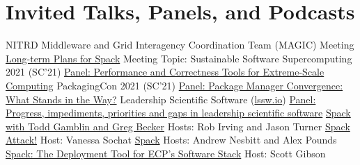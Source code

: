 \section{Invited Talks, Panels, and Podcasts}
                {NITRD Middleware and Grid Interagency Coordination Team (MAGIC) Meeting}
		{\newline \href{https://www.nitrd.gov/nitrdgroups/images/2021/MAGIC-Todd-Gamblin-12012021.pdf}{Long-term Plans for Spack}}
		{Meeting Topic: Sustainable Software}
        {}{}{}
                {Supercomputing 2021 (SC'21)}
		{\newline \href{https://sc21.supercomputing.org/presentation/?id=pan129&sess=sess236}{Panel: Performance and Correctness Tools for Extreme-Scale Computing}}
		{}
        {}{}{}
                {PackagingCon 2021 (SC'21)}
		{\newline \href{https://www.youtube.com/watch?v=NuaDWoOwPA0}{Panel: Package Manager Convergence: What Stands in the Way?}}
		{}
        {}{}{}
                {Leadership Scientific Software (\href{https://lssw.io}{lssw.io})}
		{\newline \href{https://leadershipscientificsoftware.github.io/Meeting2.html}{Panel: Progress, impediments, priorities and gaps in leadership scientific software}}
		{}
        {}{}{}
		{\newline \href{https://cppcast.com/spack/}{Spack with Todd Gamblin and Greg Becker}}
		{Hosts: Rob Irving and Jason Turner}
        {}{}{}
		{\newline \href{http://us-rse.org/rse-stories/2020/todd-gamblin/}{Spack Attack!}}
		{Host: Vanessa Sochat}
        {}{}{}
		{\newline \href{https://manifest.fm/11}{Spack}}
		{Hosts: Andrew Nesbitt and Alex Pounds}
        {}{}{}
		{\newline \href{https://www.exascaleproject.org/spack-the-deployment-tool-for-ecps-software-stack/}{Spack: The Deployment Tool for ECP’s Software Stack}}
		{Host: Scott Gibson}
